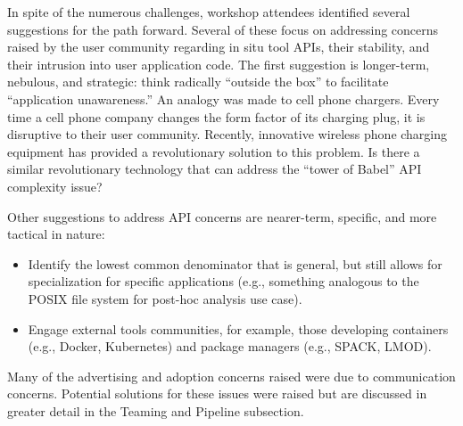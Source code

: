  In spite of the numerous challenges, workshop attendees identified several suggestions for the path forward.  Several of these focus on addressing concerns raised by the user community regarding in situ tool APIs, their stability, and their intrusion into user application code.   The first suggestion is longer-term, nebulous, and strategic: think radically ``outside the box'' to facilitate ``application unawareness.''  An analogy was made to cell phone chargers.  Every time a cell phone company changes the form factor of its charging plug, it is disruptive to their user community.  Recently, innovative wireless phone charging equipment has provided a revolutionary solution to this problem. Is there a similar revolutionary technology that can address the ``tower of Babel'' API complexity issue? 

Other suggestions to address API concerns are nearer-term, specific, and more tactical in nature:

\begin{itemize}
\item Identify the lowest common denominator that is general, but still allows for specialization for specific applications (e.g., something analogous to the POSIX file system for post-hoc analysis use case).  
\item Engage external tools communities, for example, those developing containers (e.g., Docker, Kubernetes)  and package managers (e.g., SPACK, LMOD). 
\end{itemize}

\noindent
Many of the advertising and adoption concerns raised were due to communication concerns.  Potential solutions for these issues were raised but are discussed in greater detail in the Teaming and Pipeline subsection.

